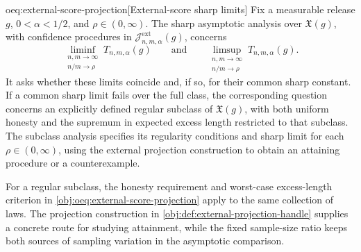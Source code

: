 \begin{remarkv}{oeq:external-score-projection}[External-score sharp limits]
Fix a measurable release \(g\), \(0<\alpha<1/2\), and \(\rho\in(0,\infty)\). The sharp asymptotic analysis over \(\mathfrak X(g)\), with confidence procedures in \(\mathcal J^{\mathrm{ext}}_{n,m,\alpha}(g)\), concerns
\[
\liminf_{\substack{n,m\to\infty\\ n/m\to\rho}}T_{n,m,\alpha}(g)
\qquad\text{and}\qquad
\limsup_{\substack{n,m\to\infty\\ n/m\to\rho}}T_{n,m,\alpha}(g).
\]
It asks whether these limits coincide and, if so, for their common sharp constant. If a common sharp limit fails over the full class, the corresponding question concerns an explicitly defined regular subclass of \(\mathfrak X(g)\), with both uniform honesty and the supremum in expected excess length restricted to that subclass. The subclass analysis specifies its regularity conditions and sharp limit for each \(\rho\in(0,\infty)\), using the external projection construction to obtain an attaining procedure or a counterexample.
\end{remarkv}

For a regular subclass, the honesty requirement and worst-case excess-length criterion in \cref{obj:oeq:external-score-projection} apply to the same collection of laws. The projection construction in \cref{obj:def:external-projection-handle} supplies a concrete route for studying attainment, while the fixed sample-size ratio keeps both sources of sampling variation in the asymptotic comparison.
